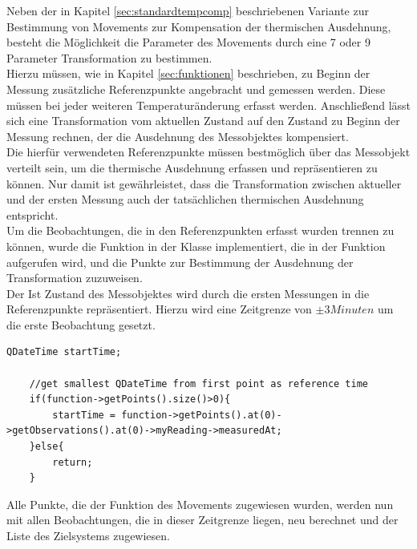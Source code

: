 Neben der in Kapitel \ref{sec:standardtempcomp} beschriebenen Variante zur Bestimmung von Movements zur Kompensation der thermischen Ausdehnung, besteht die Möglichkeit die Parameter des Movements durch eine 7 oder 9 Parameter Transformation zu bestimmen.\\
Hierzu müssen, wie in Kapitel \ref{sec:funktionen} beschrieben, zu Beginn der Messung zusätzliche Referenzpunkte angebracht und gemessen werden. Diese müssen bei jeder weiteren Temperaturänderung erfasst werden. Anschließend lässt sich eine Transformation vom aktuellen Zustand auf den Zustand zu Beginn der Messung rechnen, der die Ausdehnung des Messobjektes kompensiert. \\
Die hierfür verwendeten Referenzpunkte müssen bestmöglich über das Messobjekt verteilt sein, um die thermische Ausdehnung erfassen und repräsentieren zu können. Nur damit ist gewährleistet, dass die Transformation zwischen aktueller und der ersten Messung auch der tatsächlichen thermischen Ausdehnung entspricht.\\
Um die Beobachtungen, die in den Referenzpunkten erfasst wurden trennen zu können, wurde die Funktion  in der Klasse  implementiert, die in der Funktion  aufgerufen wird, und die Punkte zur Bestimmung der Ausdehnung der Transformation zuzuweisen.\\

Der Ist Zustand des Messobjektes wird durch die ersten Messungen in die Referenzpunkte repräsentiert. Hierzu wird eine Zeitgrenze von $\pm 3 Minuten$ um die erste Beobachtung gesetzt. 

\begin{lstlisting}[caption={Bestimmung der Referenzzeit},captionpos=t]
QDateTime startTime;

    //get smallest QDateTime from first point as reference time
    if(function->getPoints().size()>0){
        startTime = function->getPoints().at(0)->getObservations().at(0)->myReading->measuredAt;
    }else{
        return;
    }
\end{lstlisting}

Alle Punkte, die der Funktion des Movements zugewiesen wurden, werden nun mit allen Beobachtungen, die in dieser Zeitgrenze liegen, neu berechnet und der Liste des Zielsystems zugewiesen.

